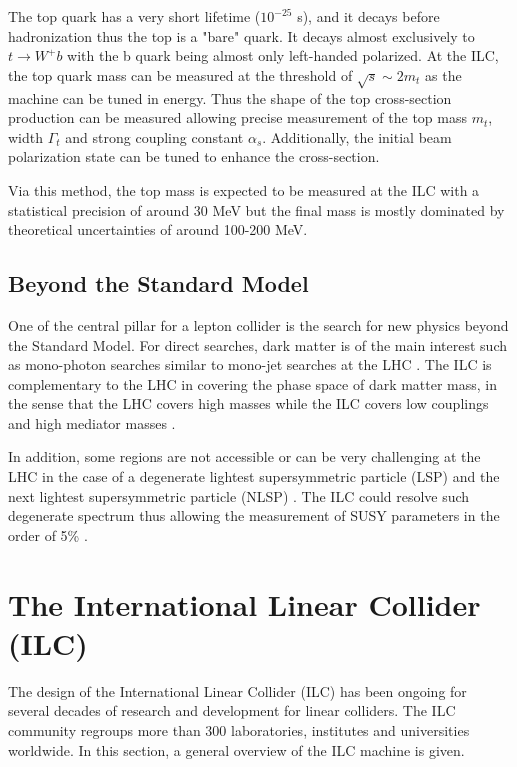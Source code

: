 The top quark has a very short lifetime ($10^{-25}$ s), and it decays before hadronization thus the top is a "bare" quark. It decays almost exclusively to $t \rightarrow W^+b$ with the b quark being almost only left-handed polarized. At the ILC, the top quark mass can be measured at the threshold of $\sqrt{s} \sim 2 m_t$ as the machine can be tuned in energy. Thus the shape of the top cross-section production can be measured allowing precise measurement of the top mass $m_t$, width $\Gamma_t$ and strong coupling constant $\alpha_s$. Additionally, the initial beam polarization state can be tuned to enhance the cross-section.

Via this method, the top mass is expected to be measured at the ILC with a statistical precision of around 30 MeV but the final mass is mostly dominated by theoretical uncertainties of around 100-200 MeV.

\subsection{Beyond the Standard Model}

One of the central pillar for a lepton collider is the search for new physics beyond the Standard Model. For direct searches, dark matter is of the main interest such as mono-photon searches similar to mono-jet searches at the LHC \cite{Gustavino:2017dub}. The ILC is complementary to the LHC in covering the phase space of dark matter mass, in the sense that the LHC covers high masses while the ILC covers low couplings and high mediator masses \cite{Habermehl:2017dxh}.

In addition, some regions are not accessible or can be very challenging at the LHC in the case of a degenerate lightest supersymmetric particle (LSP) and the next lightest supersymmetric particle (NLSP) \cite{Baer:2011ec}. The ILC could resolve such degenerate spectrum thus allowing the measurement of SUSY parameters in the order of 5\% \cite{Reuter:2016olv}.

\section{The International Linear Collider (ILC)}
\label{sec:ILC}

The design of the International Linear Collider (ILC) has been ongoing for several decades of research and development for linear colliders. The ILC community regroups more than 300 laboratories, institutes and universities worldwide. In this section, a general overview of the ILC machine is given.

